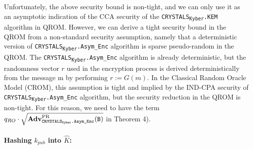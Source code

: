 \documentclass[runningheads]{llncs}
\numberwithin{equation}{section}
\begin{document}
    \noindent Unfortunately, the above security bound is non-tight, and we can only use it as an asymptotic indication of the CCA security of the \texorpdfstring{\texttt{CRYSTALS}\textsubscript{\texttt{Kyber}}\texttt{.KEM}}\/ algorithm in QROM. However, we can derive a tight security bound in the QROM from a non-standard security assumption, namely that a deterministic version of \texorpdfstring{\texttt{CRYSTALS}\textsubscript{\texttt{Kyber}}\texttt{.Asym\_Enc}}\/ algorithm is sparse pseudo-random in the QROM. The \texorpdfstring{\texttt{CRYSTALS}\textsubscript{\texttt{Kyber}}\texttt{.Asym\_Enc}}\/ algorithm is already deterministic, but the randomness vector $r$ used in the encryption process is derived deterministically from the message m by performing $r := G(m)$. In the Classical Random Oracle Model (CROM), this assumption is tight and implied by the IND-CPA security of \texorpdfstring{\texttt{CRYSTALS}\textsubscript{\texttt{Kyber}}\texttt{.Asym\_Enc}}\/ algorithm, but the security reduction in the QROM is non-tight. For this reason, we need to have the term ${q}_{RO} \cdot \sqrt{ {\text{\textbf{Adv}}}_{{\text{\texttt{CRYSTALS}\textsubscript{\texttt{Kyber}}\texttt{.Asym\_Enc}}}}^{\text{PR}}\text{(\texttt{B})} }$ in Theorem 4).


    \paragraph{\textbf{Hashing ${k}_{pub}$ into $\hat{K}$:}} 
\end{document}
